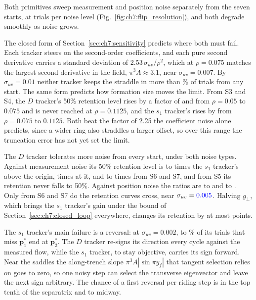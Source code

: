 Both primitives sweep measurement and position noise separately from the
seven starts, at  trials per noise level
(Fig.~\ref{fig:ch7:flip_resolution}), and both degrade smoothly as noise
grows.

The closed form of Section~\ref{sec:ch7:sensitivity} predicts where both must
fail. Each tracker steers on the second-order coefficients, and each pure
second derivative carries a standard deviation of
$2.53\,\sigma_{uv}/\rho^2$, which at $\rho = 0.075$ matches the largest
second derivative in the field, $\pi^3 A \approx 3.1$, near
$\sigma_{uv} = 0.007$. By $\sigma_{uv} = 0.01$ neither tracker keeps the
straddle in more than \% of trials from any start. The same form
predicts how formation size moves the limit. From S3 and S4, the $D$
tracker's 50\% retention level rises by a factor of  and
 from $\rho = 0.05$ to $0.075$ and is never reached at
$\rho = 0.1125$, and the $s_1$ tracker's rises by  from
$\rho = 0.075$ to $0.1125$. Both beat the factor of 2.25 the coefficient
noise alone predicts, since a wider ring also straddles a larger offset,
so over this range the truncation error has not yet set the limit.

The $D$ tracker tolerates more noise from every start, under both noise
types. Against measurement noise its 50\%
retention level is  to  times the $s_1$ tracker's above
the origin,  times at it, and  to  times from S6
and S7, and from S5 its retention never falls to 50\%. Against position
noise the ratios are  to  and  to .
Only from S6 and S7 do the retention curves cross, near
$\sigma_{uv} = \textcolor{blue}{0.005}$. Halving $g_\perp$, which brings the $s_1$
tracker's gain under the bound of Section~\ref{sec:ch7:closed_loop}
everywhere, changes its retention by at most  points.

The $s_1$ tracker's main failure is a reversal: at
$\sigma_{uv} = 0.002$,  to \% of its trials that miss
$\mathbf{p}^*_1$ end at $\mathbf{p}^*_2$. The $D$ tracker re-signs its
direction every cycle against the measured flow, while the $s_1$ tracker,
to stay objective, carries its sign forward. Near the saddles the
along-trench slope $\pi^3 A|\sin\pi y_f|$ that tangent selection relies on
goes to zero, so one noisy step can select the transverse eigenvector and
leave the next sign arbitrary. The chance of a first reversal per riding
step is  in the top tenth of the separatrix and
 to  midway.

